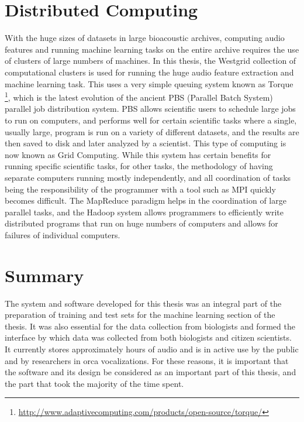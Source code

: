 \section{Distributed Computing}
With the huge sizes of datasets in large bioacoustic archives,
computing audio features and running machine learning tasks on the
entire archive requires the use of clusters of large numbers of
machines.  In this thesis, the Westgrid collection of computational
clusters is used for running the huge audio feature extraction and
machine learning task. This uses a very simple queuing system known as
Torque \footnote{\url{http://www.adaptivecomputing.com/products/open-source/torque/}},
which is the latest evolution of the ancient PBS
\cite{henderson1995job} (Parallel Batch System) parallel job
distribution system. PBS allows scientific users to schedule large
jobs to run on computers, and performs well for certain scientific
tasks where a single, usually large, program is run on a variety of
different datasets, and the results are then saved to disk and later
analyzed by a scientist. This type of computing is now known as Grid
Computing.  While this system has certain benefits for running
specific scientific tasks, for other tasks, the methodology of having
separate computers running mostly independently, and all coordination
of tasks being the responsibility of the programmer with a tool such
as MPI quickly becomes difficult. The MapReduce paradigm helps in the
coordination of large parallel tasks, and the Hadoop system allows
programmers to efficiently write distributed programs that run on huge
numbers of computers and allows for failures of individual computers.

\section{Summary}

The system and software developed for this thesis was an integral part
of the preparation of training and test sets for the machine learning
section of the thesis.  It was also essential for the data collection
from biologists and formed the interface by which data was collected
from both biologists and citizen scientists.  It currently stores
approximately \aboutHoursOfOrchiveRecordings hours of audio and is in
active use by the public and by researchers in orca vocalizations.
For these reasons, it is important that the software and its design be
considered as an important part of this thesis, and the part that took
the majority of the time spent.

